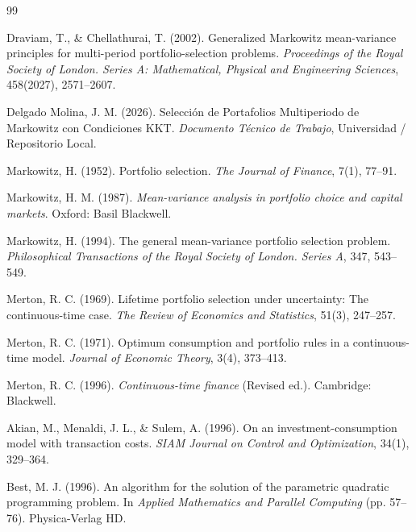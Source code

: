 \documentclass[11pt,a4paper]{report}
\numberwithin{equation}{chapter}
\begin{document}
\begin{thebibliography}{99}

Draviam, T., \& Chellathurai, T. (2002).
\newblock Generalized Markowitz mean-variance principles for multi-period portfolio-selection problems.
\newblock \emph{Proceedings of the Royal Society of London. Series A: Mathematical, Physical and Engineering Sciences}, 458(2027), 2571--2607.

Delgado Molina, J. M. (2026).
\newblock Selección de Portafolios Multiperiodo de Markowitz con Condiciones KKT.
\newblock \emph{Documento Técnico de Trabajo}, Universidad / Repositorio Local.

Markowitz, H. (1952).
\newblock Portfolio selection.
\newblock \emph{The Journal of Finance}, 7(1), 77--91.

Markowitz, H. M. (1987).
\newblock \emph{Mean-variance analysis in portfolio choice and capital markets}.
\newblock Oxford: Basil Blackwell.

Markowitz, H. (1994).
\newblock The general mean-variance portfolio selection problem.
\newblock \emph{Philosophical Transactions of the Royal Society of London. Series A}, 347, 543--549.

Merton, R. C. (1969).
\newblock Lifetime portfolio selection under uncertainty: The continuous-time case.
\newblock \emph{The Review of Economics and Statistics}, 51(3), 247--257.

Merton, R. C. (1971).
\newblock Optimum consumption and portfolio rules in a continuous-time model.
\newblock \emph{Journal of Economic Theory}, 3(4), 373--413.

Merton, R. C. (1996).
\newblock \emph{Continuous-time finance} (Revised ed.).
\newblock Cambridge: Blackwell.

Akian, M., Menaldi, J. L., \& Sulem, A. (1996).
\newblock On an investment-consumption model with transaction costs.
\newblock \emph{SIAM Journal on Control and Optimization}, 34(1), 329--364.

Best, M. J. (1996).
\newblock An algorithm for the solution of the parametric quadratic programming problem.
\newblock In \emph{Applied Mathematics and Parallel Computing} (pp. 57--76). Physica-Verlag HD.


\end{thebibliography}
\end{document}
